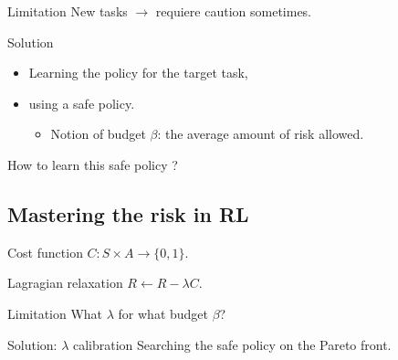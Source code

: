 \documentclass{beamer}
\begin{document}
    \begin{frame}

        \begin{alertblock}{Limitation}
            New tasks $\rightarrow$ requiere caution sometimes.
        \end{alertblock}

        \pause
        \begin{exampleblock}{Solution}
            \begin{itemize}
                \item Learning the policy for the target task,
                \item using a safe policy.
                \begin{itemize}
                    \item Notion of budget $\beta$: the average amount of risk allowed.
                \end{itemize}
            \end{itemize}
        \end{exampleblock}
        \pause
        \begin{block}{}
            How to learn this safe policy ?
        \end{block}

    \end{frame}

    \subsection{Mastering the risk in RL}

    \begin{frame}

        \begin{block}{Cost function}
            $C:S\times A \rightarrow \{0,1\}$.
        \end{block}
        \pause
        \begin{block}{Lagragian relaxation}
            $R \leftarrow R - \lambda C$.
        \end{block}

        \pause
        \begin{alertblock}{Limitation}
            What $\lambda$ for what budget $\beta$?
        \end{alertblock}
        \pause
        \begin{exampleblock}{Solution: $\lambda$ calibration}%
            Searching the safe policy on the Pareto front.
        \end{exampleblock}


    \end{frame}
\end{document}
